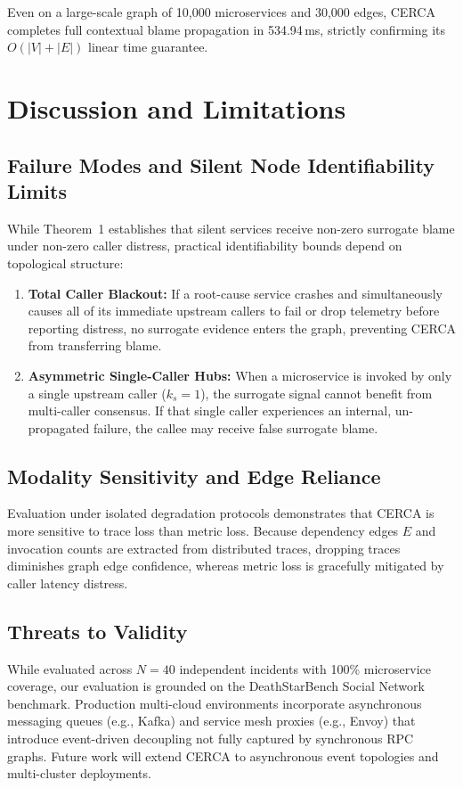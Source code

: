 \documentclass[conference]{IEEEtran}
\begin{document}
Even on a large-scale graph of 10{,}000 microservices and 30{,}000 edges, CERCA completes full contextual blame propagation in 534.94\,ms, strictly confirming its $O(|V| + |E|)$ linear time guarantee.

\section{Discussion and Limitations}

\subsection{Failure Modes and Silent Node Identifiability Limits}
While Theorem~1 establishes that silent services receive non-zero surrogate blame under non-zero caller distress, practical identifiability bounds depend on topological structure:
\begin{enumerate}
    \item \textbf{Total Caller Blackout:} If a root-cause service crashes and simultaneously causes all of its immediate upstream callers to fail or drop telemetry before reporting distress, no surrogate evidence enters the graph, preventing CERCA from transferring blame.
    \item \textbf{Asymmetric Single-Caller Hubs:} When a microservice is invoked by only a single upstream caller ($k_s = 1$), the surrogate signal cannot benefit from multi-caller consensus. If that single caller experiences an internal, un-propagated failure, the callee may receive false surrogate blame.
\end{enumerate}

\subsection{Modality Sensitivity and Edge Reliance}
Evaluation under isolated degradation protocols demonstrates that CERCA is more sensitive to trace loss than metric loss. Because dependency edges $E$ and invocation counts are extracted from distributed traces, dropping traces diminishes graph edge confidence, whereas metric loss is gracefully mitigated by caller latency distress.

\subsection{Threats to Validity}
While evaluated across $N = 40$ independent incidents with 100\% microservice coverage, our evaluation is grounded on the DeathStarBench Social Network benchmark. Production multi-cloud environments incorporate asynchronous messaging queues (e.g., Kafka) and service mesh proxies (e.g., Envoy) that introduce event-driven decoupling not fully captured by synchronous RPC graphs. Future work will extend CERCA to asynchronous event topologies and multi-cluster deployments.
\end{document}
